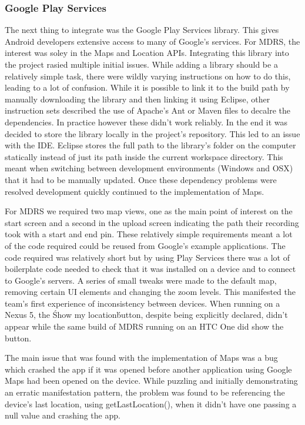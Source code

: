 \documentclass{l3proj}
\begin{document}
\subsubsection{Google Play Services}    The next thing to integrate was the Google Play Services library. This gives Android developers extensive access to many of Google's services. For MDRS, the interest was soley in the Maps and Location APIs. Integrating this library into the project rasied multiple initial issues. While adding a library should be a relatively simple task, there were wildly varying instructions on how to do this, leading to a lot of confusion. While it is possible to link it to the build path by manually downloading the library and then linking it using Eclipse, other instruction sets described the use of Apache's Ant or Maven files to decalre the dependencies. In practice however these didn't work reliably. In the end it was decided to store the library locally in the project's repository. This led to an issue with the IDE. Eclipse stores the full path to the library's folder on the computer statically instead of just its path inside the current workspace directory. This meant when switching between development environments (Windows and OSX) that it had to be manually updated. Once these dependency problems were resolved development quickly continued to the implementation of Maps.

For MDRS we required two map views, one as the main point of interest on the start screen and a second in the upload screen indicating the path their recording took with a start and end pin. These relatively simple requirements meant a lot of the code required could be reused from Google's example applications. The code required was relatively short but by using Play Services there was a lot of boilerplate code needed to check that it was installed on a device and to connect to Google's servers. A series of small tweaks were made to the default map, removing certain UI elements and changing the zoom levels. This manifested the team's first experience of inconsistency between devices. When running on a Nexus 5, the \'Show my location\' button, despite being explicitly declared, didn't appear while the same build of MDRS running on an HTC One did show the button.

The main issue that was found with the implementation of Maps was a bug which crashed the app if it was opened before another application using Google Maps had been opened on the device. While puzzling and initially demonstrating an erratic manifestation pattern, the problem was found to be referencing the device's last location, using getLastLocation(), when it didn't have one passing a null value and crashing the app.
\end{document}
